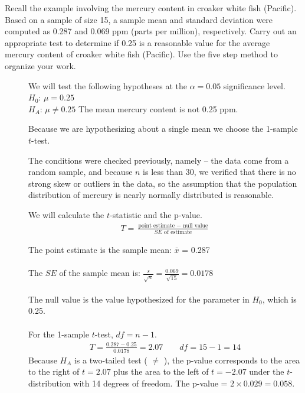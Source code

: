 \begin{examplewrap}
\begin{nexample}
{Recall the example involving the mercury content in croaker white fish (Pacific). Based on a sample of size 15, a sample mean and standard deviation were computed as 0.287 and 0.069 ppm (parts per million), respectively. Carry out an appropriate test to determine if 0.25 is a reasonable value for the average mercury content of croaker white fish (Pacific).  Use the five step method to organize your work.}

\begin{description}
\item[]  We will test the following hypotheses at the $\alpha=0.05$ significance level.\\
$H_0$: $\mu=0.25$   \\
$H_A$: $\mu \ne 0.25$ \quad The mean mercury content is not 0.25 ppm.\\
 
\item[] Because we are hypothesizing about a single mean we choose the \mbox{1-sample $t$-test.}
\item[]  The conditions were checked previously, namely -- the data come from a random sample, and because $n$ is less than 30, we verified that there is no strong skew or outliers in the data, so the assumption that the population distribution of mercury is nearly normally distributed is reasonable.  
\item[  ]  We will calculate the $t$-statistic and the p-value.
\begin{align*}
T = \frac{\text{point estimate } - \text{ null value}}{SE \text{ of estimate}}
\end{align*}

The point estimate is the sample mean:  $\bar{x}$ =  0.287 \\
\\
The $SE$ of the sample mean is:  $\frac{s}{\sqrt{n}} = \frac{0.069}{\sqrt{15}} = 0.0178$\\ 
\\
The null value is the value hypothesized for the parameter in $H_0$, which is 0.25.\\
\\
For the 1-sample $t$-test, $df = n-1$.
\\
\begin{align*}
T = \frac{0.287 - 0.25}{0.0178} = 2.07 \qquad df= 15-1=14
\end{align*}
Because $H_A$ is a two-tailed test ( $\ne$ ), the p-value corresponds to the area to the right of $t=2.07$ plus the area to the left of $t=-2.07$ under the $t$-distribution with 14 degrees of freedom.  The p-value = $2\times 0.029 = 0.058$.  


\end{description}
\end{nexample}
\end{examplewrap}
